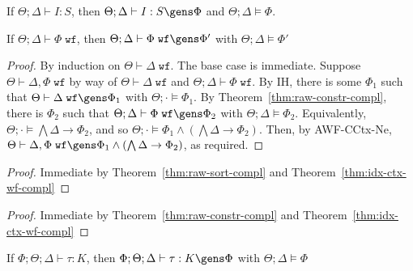 


\begin{theorem}
If $\Theta;\Delta \vdash I : S$, then $\Theta;\Delta \vdash I : S \gens \Phi$ and $\Theta;\Delta \vDash \Phi$.
\label{thm:raw-sort-compl}
\end{theorem}


\begin{theorem}
If $\Theta ; \Delta \vdash \Phi \; \texttt{wf}$, then $\Theta ; \Delta \vdash \Phi \; \texttt{wf} \gens \Phi'$ with $\Theta ; \Delta \vDash \Phi'$
\label{thm:raw-constr-compl}
\end{theorem}

\idxctxwfcompl*
\begin{proof}
By induction on $\Theta \vdash \Delta \; \texttt{wf}$. The base case is immediate.
Suppose $\Theta \vdash \Delta,\Phi \; \texttt{wf}$ by way of $\Theta \vdash \Delta \; \texttt{wf}$ and $\Theta ; \Delta \vdash \Phi \; \texttt{wf}$.
By IH, there is some $\Phi_1$ such that $\Theta \vdash \Delta \; \texttt{wf} \gens \Phi_1$ with $\Theta ; \cdot \vDash \Phi_1$. By Theorem~\ref{thm:raw-constr-compl}, there is $\Phi_2$ such that $\Theta ; \Delta \vdash \Phi \; \texttt{wf} \gens \Phi_2$ with $\Theta ; \Delta \vDash \Phi_2$. Equivalently, $\Theta ; \cdot \vDash \bigwedge \Delta \to \Phi_2$, and so $\Theta ; \cdot \vDash \Phi_1 \wedge (\bigwedge \Delta \to \Phi_2)$. Then, by AWF-CCtx-Ne, $\Theta \vdash \Delta,\Phi \; \texttt{wf} \gens \Phi_1 \wedge (\bigwedge \Delta \to \Phi_2)$, as required.
\end{proof}

\sortcompl*
\begin{proof}
Immediate by Theorem~\ref{thm:raw-sort-compl} and Theorem~\ref{thm:idx-ctx-wf-compl}
\end{proof}

\constrcompl*
\begin{proof}
Immediate by Theorem~\ref{thm:raw-constr-compl} and Theorem~\ref{thm:idx-ctx-wf-compl}
\end{proof}

\begin{theorem}
If $\Phi;\Theta;\Delta \vdash \tau : K$, then $\Phi;\Theta;\Delta \vdash \tau : K \gens \Phi$ with $\Theta ; \Delta \vDash \Phi$
\label{thm:raw-kind-compl}
\end{theorem}


